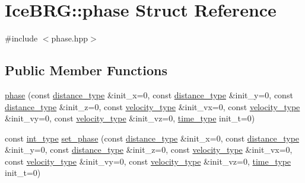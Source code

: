 \hypertarget{structIceBRG_1_1phase}{}\section{Ice\+B\+R\+G\+:\+:phase Struct Reference}
\label{structIceBRG_1_1phase}


{\ttfamily \#include $<$phase.\+hpp$>$}

\subsection*{Public Member Functions}
\begin{DoxyCompactItemize}
\item 
\hyperlink{structIceBRG_1_1phase_a8fae2a7a33d826010fe86e5d21f368bf}{phase} (const \hyperlink{namespaceIceBRG_a45499647eb87e24c10ab32c628711cec}{distance\+\_\+type} \&init\+\_\+x=0, const \hyperlink{namespaceIceBRG_a45499647eb87e24c10ab32c628711cec}{distance\+\_\+type} \&init\+\_\+y=0, const \hyperlink{namespaceIceBRG_a45499647eb87e24c10ab32c628711cec}{distance\+\_\+type} \&init\+\_\+z=0, const \hyperlink{namespaceIceBRG_a34f8ef3b46f3408301e3c28197095eff}{velocity\+\_\+type} \&init\+\_\+vx=0, const \hyperlink{namespaceIceBRG_a34f8ef3b46f3408301e3c28197095eff}{velocity\+\_\+type} \&init\+\_\+vy=0, const \hyperlink{namespaceIceBRG_a34f8ef3b46f3408301e3c28197095eff}{velocity\+\_\+type} \&init\+\_\+vz=0, \hyperlink{namespaceIceBRG_abf6c442a2e180ef52c5cefe18e47c327}{time\+\_\+type} init\+\_\+t=0)
\item 
const \hyperlink{lib_2IceBRG__main_2common_8h_ac4de9d9335536ac22821171deec8d39e}{int\+\_\+type} \hyperlink{structIceBRG_1_1phase_a74363edea857784aa3ad3a19706eb15d}{set\+\_\+phase} (const \hyperlink{namespaceIceBRG_a45499647eb87e24c10ab32c628711cec}{distance\+\_\+type} \&init\+\_\+x=0, const \hyperlink{namespaceIceBRG_a45499647eb87e24c10ab32c628711cec}{distance\+\_\+type} \&init\+\_\+y=0, const \hyperlink{namespaceIceBRG_a45499647eb87e24c10ab32c628711cec}{distance\+\_\+type} \&init\+\_\+z=0, const \hyperlink{namespaceIceBRG_a34f8ef3b46f3408301e3c28197095eff}{velocity\+\_\+type} \&init\+\_\+vx=0, const \hyperlink{namespaceIceBRG_a34f8ef3b46f3408301e3c28197095eff}{velocity\+\_\+type} \&init\+\_\+vy=0, const \hyperlink{namespaceIceBRG_a34f8ef3b46f3408301e3c28197095eff}{velocity\+\_\+type} \&init\+\_\+vz=0, \hyperlink{namespaceIceBRG_abf6c442a2e180ef52c5cefe18e47c327}{time\+\_\+type} init\+\_\+t=0)
\end{DoxyCompactItemize}
